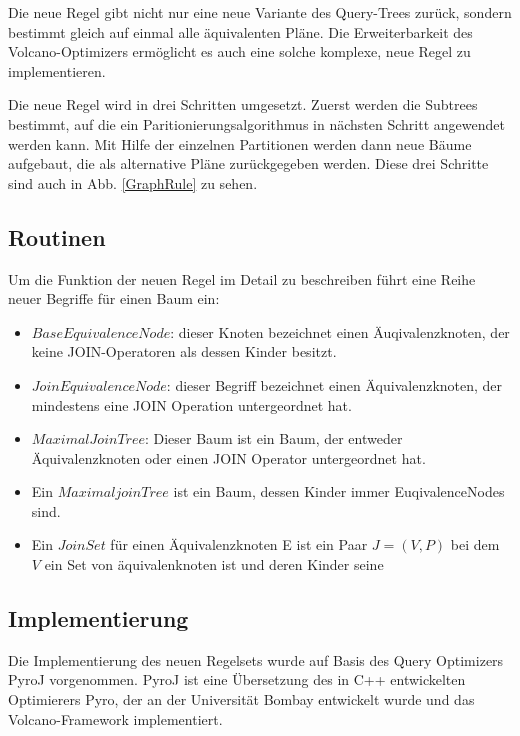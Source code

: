 Die neue Regel gibt nicht nur eine neue Variante des Query-Trees zurück, sondern bestimmt gleich auf einmal alle äquivalenten Pläne. Die Erweiterbarkeit des Volcano-Optimizers ermöglicht es auch eine solche komplexe, neue Regel zu implementieren.

Die neue Regel wird in drei Schritten umgesetzt. Zuerst werden die Subtrees bestimmt, auf die ein Paritionierungsalgorithmus in nächsten Schritt angewendet werden kann. Mit Hilfe der einzelnen Partitionen werden dann neue Bäume aufgebaut, die als alternative Pläne zurückgegeben werden. Diese drei Schritte sind auch in Abb. \ref{GraphRule} zu sehen.

\subsection{Routinen}











Um die Funktion der neuen Regel im Detail zu beschreiben führt \cite{shanbhag2014optimizing} eine Reihe neuer Begriffe für einen Baum ein:

\begin{itemize}
\item $Base Equivalence Node$: dieser Knoten bezeichnet einen Äuqivalenzknoten, der keine JOIN-Operatoren als dessen Kinder besitzt.
\item $Join Equivalence Node$: dieser Begriff bezeichnet einen Äquivalenzknoten, der mindestens eine JOIN Operation untergeordnet hat.
\item $Maximal Join Tree$: Dieser Baum ist ein Baum, der entweder Äquivalenzknoten oder einen JOIN Operator untergeordnet hat.
\item Ein $Maximal join Tree$ ist ein Baum, dessen Kinder immer EuqivalenceNodes sind.
\item Ein $Join Set$ für einen Äquivalenzknoten E ist ein Paar $J = (V, P)$ bei dem $V$ ein Set von äquivalenknoten ist und deren Kinder seine 
\end{itemize}


\subsection{Implementierung}
Die Implementierung des neuen Regelsets wurde auf Basis des Query Optimizers PyroJ vorgenommen. PyroJ ist eine Übersetzung des in C++ entwickelten Optimierers Pyro, der an der Universität Bombay entwickelt wurde und das Volcano-Framework implementiert.

